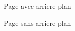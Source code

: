 \documentclass{article}
\begin{document}
	
	\BgThispage %
	
	Page avec arriere plan
	
	
	\clearpage
	
	Page sans arriere plan
	
\end{document}
